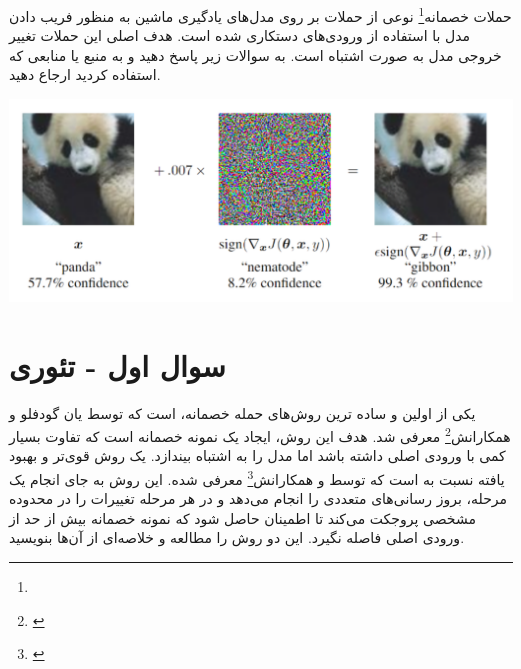 حملات خصمانه\footnote{} نوعی از حملات بر روی مدل‌های یادگیری ماشین به منظور فریب دادن مدل با استفاده از ورودی‌های دستکاری شده است. هدف اصلی این حملات تغییر خروجی مدل به صورت اشتباه است. به سوالات زیر پاسخ دهید و به منبع یا منابعی که استفاده کردید ارجاع دهید.


\begin{center}
	\includegraphics*[width=0.8\linewidth]{pics/img1.png}
	\label{تغییر نمونه ورودی}
\end{center}


\section{سوال اول - تئوری}
یکی از اولین و ساده ترین روش‌های حمله خصمانه،  است که توسط یان گودفلو و همکارانش\footnote{‬‬} معرفی شد. هدف این روش، ایجاد یک نمونه خصمانه است که تفاوت بسیار کمی با ورودی اصلی داشته باشد اما مدل را به اشتباه بیندازد.  یک روش قوی‌تر و بهبود یافته نسبت به  است که توسط  و همکارانش\footnote{‫‪‬‬} معرفی شده. این روش به جای انجام یک مرحله، بروز رسانی‌های متعددی را انجام می‌دهد و در هر مرحله تغییرات را در محدوده مشخصی پروجکت می‌کند تا اطمینان حاصل شود که نمونه خصمانه بیش از حد از ورودی اصلی فاصله نگیرد. این دو روش را مطالعه و خلاصه‌ای از آن‌ها بنویسید.


\begin{qsolve}
	
\end{qsolve}




